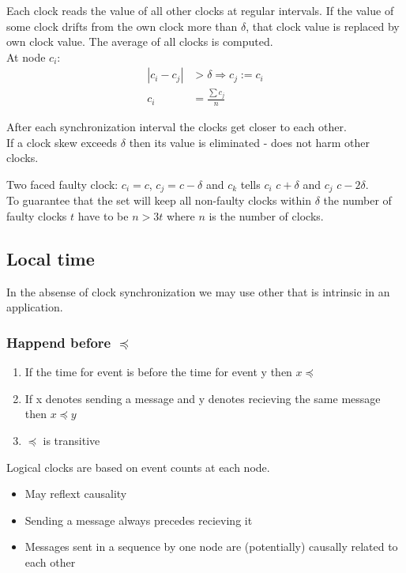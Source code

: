 \documentclass[course, english]{Notes}
\begin{document}
\begin{theorem} 
	Each clock reads the value of all other clocks at regular intervals. If
	the value of some clock drifts from the own clock more than $\delta$,
	that clock value is replaced by own clock value. The average of all
	clocks is computed.\\
	At node $c_i$:
	\begin{align*}
		|c_i-c_j|&>\delta \Rightarrow c_j:=c_i \\
		c_i &= \frac{\sum{c_j}}{n}
	\end{align*}
	\label{Lamport/Melliaar-smith algoritm}
\end{theorem}
After each synchronization interval the clocks get closer to each other. \\
If a clock skew exceeds $\delta$ then its value is eliminated - does not harm
other clocks.

Two faced faulty clock: $c_i=c$, $c_j=c-\delta$ and $c_k$ tells $c_i$ $c+\delta$
and $c_j$ $c-2\delta$.\\
To guarantee that the set will keep all non-faulty clocks within $\delta$ the
number of faulty clocks $t$ have to be $n>3t$ where $n$ is the number of clocks.

\subsection{Local time}
In the absense of clock synchronization we may use other that is intrinsic in an
application.
\subsubsection{Happend before $\preccurlyeq$}
\begin{enumerate}
	\item If the time for event is before the time for event y then
		$x\preccurlyeq$
	\item If x denotes sending a message and y denotes recieving the same
		message then $x\preccurlyeq y$
	\item $\preccurlyeq$ is transitive
\end{enumerate}
Logical clocks are based on event counts at each node.
\begin{itemize}
	\item May reflext causality
	\item Sending a message always precedes recieving it
	\item Messages sent in a sequence by one node are (potentially) causally
		related to each other
\end{itemize}
\end{document}

